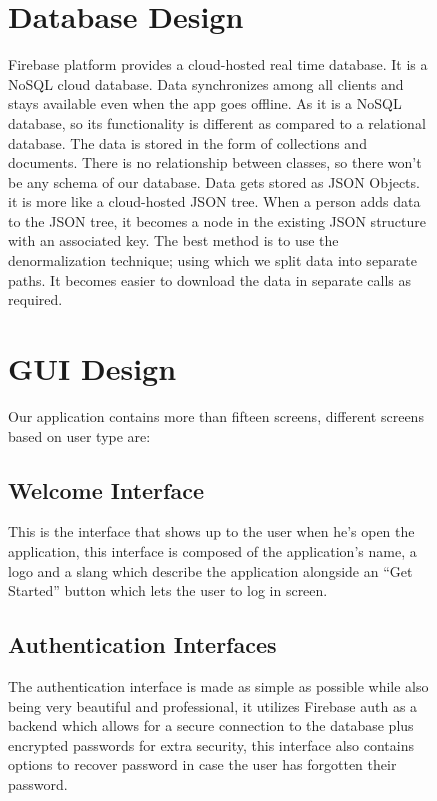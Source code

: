 \begin{figure}
\section{Database Design}
Firebase platform provides a cloud-hosted real time database. It is a NoSQL cloud database. Data synchronizes among all clients and stays available even when the app goes offline. As it is a NoSQL database, so its functionality is different as compared to a relational database. The data is stored in the form of collections and documents. There is no relationship between classes, so there won’t be any schema of our database. Data gets stored as JSON Objects. it is more like a cloud-hosted JSON tree. When a person adds data to the JSON tree, it becomes a node in the existing JSON structure with an associated key. The best method is to use the denormalization technique; using which we split data into separate paths. It becomes easier to download the data in separate calls as required.
\end{figure}

\begin{figure}
\section{GUI Design}
Our application contains more than fifteen screens, different screens based on user type are:
\end{figure}

\begin{figure}
\subsection{Welcome Interface}
This is the interface that shows up to the user when he’s open the application, this interface is composed of the application’s name, a logo and a slang which describe the application alongside an “Get Started” button which lets the user to log in screen.
\begin{center}
\end{center}
\subsection{Authentication Interfaces}
The authentication interface is made as simple as possible while also being very beautiful and professional, it utilizes Firebase auth as a backend which allows for a secure connection to the database plus encrypted passwords for extra security, this interface also contains options to recover password in case the user has forgotten their password.

\end{figure}

